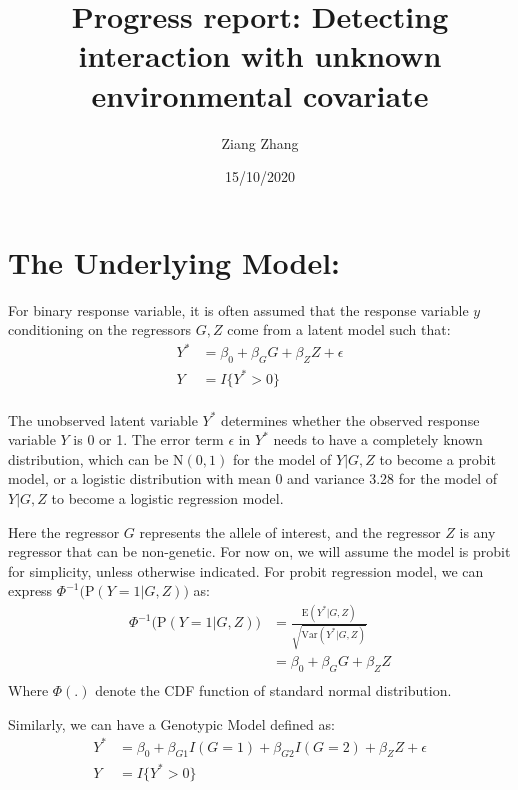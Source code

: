 \documentclass[
]{article}
\title{Progress report: Detecting interaction with unknown environmental
covariate}
\author{Ziang Zhang}
\date{15/10/2020}
\begin{document}
\maketitle

{
\setcounter{tocdepth}{2}
\tableofcontents
}
\hypertarget{the-underlying-model}{%
\section{The Underlying Model:}\label{the-underlying-model}}

For binary response variable, it is often assumed that the response
variable \(y\) conditioning on the regressors \(G,Z\) come from a latent
model such that: \begin{equation}\label{eqn:latentformulation}
\begin{aligned}
Y^* &= \beta_0 + \beta_G G + \beta_Z Z + \epsilon \\
Y &= I\{Y^*>0\} \\
\end{aligned}
\end{equation}

The unobserved latent variable \(Y^*\) determines whether the observed
response variable \(Y\) is 0 or 1. The error term \(\epsilon\) in
\(Y^*\) needs to have a completely known distribution, which can be
\(\text{N}(0,1)\) for the model of \(Y|G,Z\) to become a probit model,
or a logistic distribution with mean 0 and variance 3.28 for the model
of \(Y|G,Z\) to become a logistic regression model.

Here the regressor \(G\) represents the allele of interest, and the
regressor \(Z\) is any regressor that can be non-genetic. For now on, we
will assume the model is probit for simplicity, unless otherwise
indicated. For probit regression model, we can express
\(\Phi^{-1}\bigg(\text{P}(Y=1|G,Z)\bigg)\) as:
\begin{equation}\label{eqn:probitModelLinearity}
\begin{aligned}
\Phi^{-1}\bigg(\text{P}(Y=1|G,Z)\bigg) &= \frac{\text{E}(Y^* |G,Z)}{\sqrt{\text{Var}(Y^* |G,Z)}} \\
                                       &= \beta_0 + \beta_G G + \beta_Z Z \\
\end{aligned}
\end{equation} Where \(\Phi(.)\) denote the CDF function of standard
normal distribution.

Similarly, we can have a Genotypic Model defined as:\\
\begin{equation}\label{eqn:latentformulationGeno}
\begin{aligned}
Y^* &= \beta_0 + \beta_{G1} I(G = 1) + \beta_{G2} I(G = 2) + \beta_Z Z + \epsilon \\
Y &= I\{Y^*>0\} \\
\end{aligned}
\end{equation}
\end{document}
